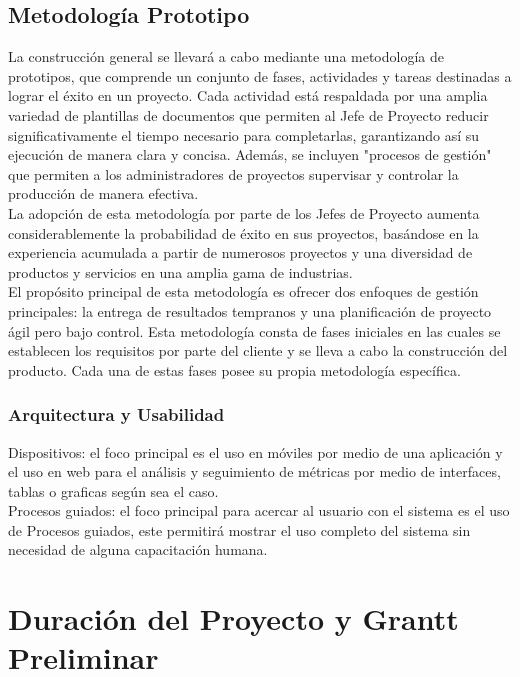 \documentclass{report}
\begin{document}
			\subsection{Metodología Prototipo}
			La construcción general se llevará a cabo mediante una metodología de prototipos, que comprende un conjunto de fases, actividades y tareas destinadas a lograr el éxito en un proyecto. Cada actividad está respaldada por una amplia variedad de plantillas de documentos que permiten al Jefe de Proyecto reducir significativamente el tiempo necesario para completarlas, garantizando así su ejecución de manera clara y concisa. Además, se incluyen "procesos de gestión" que permiten a los administradores de proyectos supervisar y controlar la producción de manera efectiva.\\
			
			La adopción de esta metodología por parte de los Jefes de Proyecto aumenta considerablemente la probabilidad de éxito en sus proyectos, basándose en la experiencia acumulada a partir de numerosos proyectos y una diversidad de productos y servicios en una amplia gama de industrias.\\
			
			El propósito principal de esta metodología es ofrecer dos enfoques de gestión principales: la entrega de resultados tempranos y una planificación de proyecto ágil pero bajo control. Esta metodología consta de fases iniciales en las cuales se establecen los requisitos por parte del cliente y se lleva a cabo la construcción del producto. Cada una de estas fases posee su propia metodología específica.
			
				\subsubsection{Arquitectura y Usabilidad}
					Dispositivos: el foco principal es el uso en móviles por medio de una aplicación y el uso en web para el análisis y seguimiento de métricas por medio de interfaces, tablas o graficas según sea el caso. \\
					\break
					Procesos guiados: el foco principal para acercar al usuario con el sistema es el uso de Procesos guiados, este permitirá mostrar el uso completo del sistema sin necesidad de alguna capacitación humana.\\
									
		\section{Duración del Proyecto y Grantt Preliminar}	
	
\end{document}
